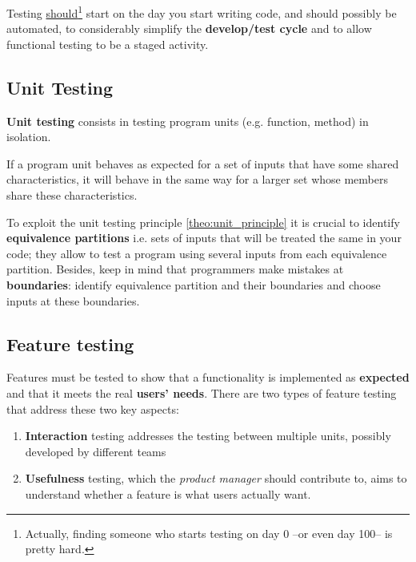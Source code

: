 Testing \underline{should}\footnote{Actually, finding someone who starts testing on day 0 {--}or even day 100{--} is pretty hard.} start on the day you start writing code, and should possibly be automated, to considerably simplify the \textbf{develop/test cycle} and to allow functional testing to be a staged activity.

\subsection{Unit Testing}
\textbf{Unit testing} consists in testing program units (e.g. function, method) in isolation.

\begin{theorem}
   \label{theo:unit_principle}
If a program unit behaves as expected for a set of inputs that have some shared
characteristics, it will behave in the same way for a larger set whose members share
these characteristics.

\end{theorem}

To exploit the unit testing principle \ref{theo:unit_principle} it is crucial to
identify \textbf{equivalence partitions} i.e. sets of inputs that will be treated the same in your code;
they allow to test a program using several inputs from each equivalence partition.
Besides, keep in mind that programmers make mistakes at \textbf{boundaries}: 
identify equivalence partition and their boundaries and choose inputs at these boundaries.

\subsection{Feature testing}
Features must be tested to show that a functionality is implemented as \textbf{expected} and that it meets the real \textbf{users' needs}.
There are two types of feature testing that address these two key aspects:
\begin{enumerate}
   \item \textbf{Interaction} testing addresses the testing between multiple units, possibly developed by different teams
   \item \textbf{Usefulness} testing, which the \textit{product manager} should contribute to, aims to understand whether a feature is what users actually want.
\end{enumerate}

